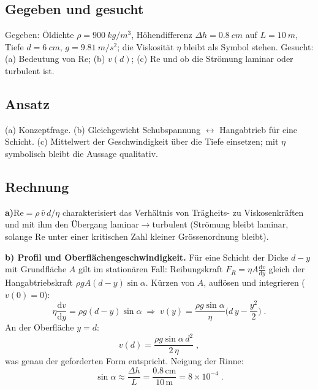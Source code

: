 
\subsection*{Gegeben und gesucht}
Gegeben: Öldichte $\rho=\qty{900}{kg/m^3}$, Höhendifferenz
$\Delta h=\qty{0.8}{cm}$ auf $L=\qty{10}{m}$, Tiefe $d=\qty{6}{cm}$,
$g=\qty{9.81}{m/s^2}$; die Viskosität $\eta$ bleibt als Symbol stehen.
Gesucht: (a) Bedeutung von $\mathrm{Re}$; (b) $v(d)$; (c) $\mathrm{Re}$
und ob die Strömung laminar oder turbulent ist.

\subsection*{Ansatz}
(a) Konzeptfrage. (b) Gleichgewicht Schubspannung $\leftrightarrow$
Hangabtrieb für eine Schicht. (c) Mittelwert der Geschwindigkeit über die
Tiefe einsetzen; mit $\eta$ symbolisch bleibt die Aussage qualitativ.

\subsection*{Rechnung}
\textbf{a)}\quad$ \mathrm{Re}=\rho\,\bar v\,d/\eta $ charakterisiert das
Verhältnis von Trägheits- zu Viskosenkräften und mit ihm den Übergang
laminar$\to$turbulent (Strömung bleibt laminar, solange $\mathrm{Re}$ unter
einer kritischen Zahl kleiner Grössenordnung bleibt).

\textbf{b) Profil und Oberflächengeschwindigkeit.} Für eine Schicht der Dicke
$d-y$ mit Grundfläche $A$ gilt im stationären Fall: Reibungskraft
$F_R=\eta A \frac{\mathrm dv}{\mathrm dy}$ gleich der Hangabtriebskraft
$\rho g A(d-y)\sin\alpha$. Kürzen von $A$, auflösen und integrieren
($v(0)=0$):
\begin{equation}
  \eta\frac{\mathrm dv}{\mathrm dy}=\rho g (d-y)\sin\alpha
  \;\Rightarrow\;
  v(y)=\frac{\rho g\sin\alpha}{\eta}\Big(d\,y-\frac{y^2}{2}\Big)\;.
\end{equation}
An der Oberfläche $y=d$:
\begin{equation}
  v(d)=\frac{\rho g\sin\alpha\, d^2}{2\,\eta}\;,
\end{equation}
was genau der geforderten Form entspricht. Neigung der Rinne:
\begin{equation}
  \sin\alpha\approx\frac{\Delta h}{L}
  =\frac{0.8\,\mathrm{cm}}{10\,\mathrm m}=8\times10^{-4}\;.
\end{equation}

